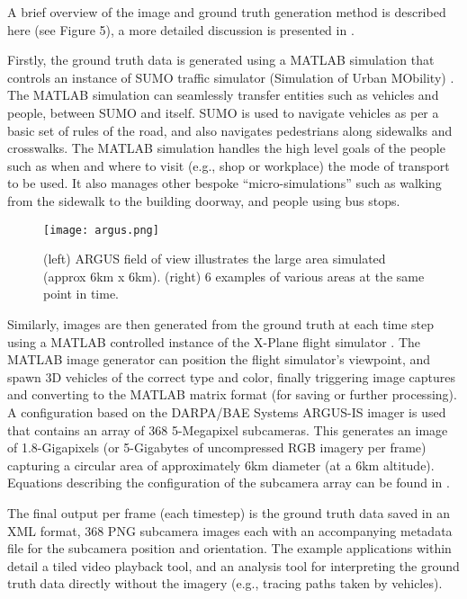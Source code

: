 \documentclass[conference]{IEEEtran}
\begin{document}
A brief overview of the image and ground truth generation method is described here (see Figure 5), a more detailed discussion is presented in \cite{griffith2018}.

Firstly, the ground truth data is generated using a MATLAB simulation that controls an instance of SUMO traffic simulator (Simulation of Urban MObility) \cite{sumo}.  The MATLAB simulation can seamlessly transfer entities such as vehicles and people, between SUMO and itself.  SUMO is used to navigate vehicles as per a basic set of rules of the road, and also navigates pedestrians along sidewalks and crosswalks.  The MATLAB simulation handles the high level goals of the people such as when and where to visit (e.g., shop or workplace) the mode of transport to be used. It also manages other bespoke "`micro-simulations"' such as walking from the sidewalk to the building doorway, and people using bus stops. 

\begin{figure}[!t]
\centerline{\texttt{[image: argus.png]}}
\caption{(left) ARGUS field of view illustrates the large area simulated (approx 6km x 6km). (right) 6 examples of  various areas at the same point in time.}
\label{fig}
\end{figure}

Similarly, images are then generated from the ground truth at each time step using a MATLAB controlled instance of the X-Plane flight simulator \cite{xplanewebsite}.  The MATLAB image generator can position the flight simulator's viewpoint, and spawn 3D vehicles of the correct type and color, finally triggering image captures and converting to the MATLAB matrix format (for saving or further processing).  A configuration based on the DARPA/BAE Systems ARGUS-IS imager \cite{argus} is used that contains an array of 368 5-Megapixel subcameras.  This generates an image of 1.8-Gigapixels (or 5-Gigabytes of uncompressed RGB imagery per frame) capturing a circular area of approximately 6km diameter (at a 6km altitude).  Equations describing the configuration of the subcamera array can be found in \cite{griffith2018}.  

The final output per frame (each timestep) is the ground truth data saved in an XML format, 368 PNG subcamera images each with an accompanying metadata file for the subcamera position and orientation.  The example applications within \cite{griffith2018} detail a tiled video playback tool, and an analysis tool for interpreting the ground truth data directly without the imagery (e.g., tracing paths taken by vehicles). \\
\end{document}
